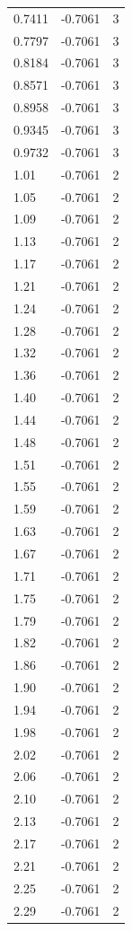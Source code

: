 \begin{longtable}{lrr}
  0.7411 & -0.7061 & 3 \\
  0.7797 & -0.7061 & 3 \\
  0.8184 & -0.7061 & 3 \\
  0.8571 & -0.7061 & 3 \\
  0.8958 & -0.7061 & 3 \\
  0.9345 & -0.7061 & 3 \\
  0.9732 & -0.7061 & 3 \\
  1.01 & -0.7061 & 2 \\
  1.05 & -0.7061 & 2 \\
  1.09 & -0.7061 & 2 \\
  1.13 & -0.7061 & 2 \\
  1.17 & -0.7061 & 2 \\
  1.21 & -0.7061 & 2 \\
  1.24 & -0.7061 & 2 \\
  1.28 & -0.7061 & 2 \\
  1.32 & -0.7061 & 2 \\
  1.36 & -0.7061 & 2 \\
  1.40 & -0.7061 & 2 \\
  1.44 & -0.7061 & 2 \\
  1.48 & -0.7061 & 2 \\
  1.51 & -0.7061 & 2 \\
  1.55 & -0.7061 & 2 \\
  1.59 & -0.7061 & 2 \\
  1.63 & -0.7061 & 2 \\
  1.67 & -0.7061 & 2 \\
  1.71 & -0.7061 & 2 \\
  1.75 & -0.7061 & 2 \\
  1.79 & -0.7061 & 2 \\
  1.82 & -0.7061 & 2 \\
  1.86 & -0.7061 & 2 \\
  1.90 & -0.7061 & 2 \\
  1.94 & -0.7061 & 2 \\
  1.98 & -0.7061 & 2 \\
  2.02 & -0.7061 & 2 \\
  2.06 & -0.7061 & 2 \\
  2.10 & -0.7061 & 2 \\
  2.13 & -0.7061 & 2 \\
  2.17 & -0.7061 & 2 \\
  2.21 & -0.7061 & 2 \\
  2.25 & -0.7061 & 2 \\
  2.29 & -0.7061 & 2 \\

\end{longtable}
